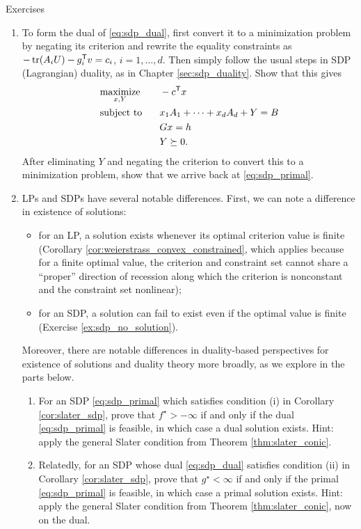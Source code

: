\begin{xcb}{Exercises}
\begin{enumerate}[label=\thechapter.\arabic*]
\item \label{ex:sdp_dual_dual}
  To form the dual of \eqref{eq:sdp_dual}, first convert it to a minimization
  problem by negating its criterion and rewrite the equality constraints as
  $-\operatorname{tr}(A_iU) - g_i^{\mathsf{T}} v = c_i$, $i = 1,\dots,d$. Then simply follow the usual
  steps in SDP (Lagrangian) duality, as in Chapter \ref{sec:sdp_duality}. Show
  that this gives    
  \begin{alignat*}{2}
  &\operatorname*{maximize}_{x,Y} \quad && -c^{\mathsf{T}} x \\ 
  &\operatorname{subject\,\,to} && x_1 A_1 + \cdots + x_d A_d + Y = B \\
  & && Gx = h \\
  & && Y \succeq 0.
  \end{alignat*}
  After eliminating $Y$ and negating the criterion to convert this to a
  minimization problem, show that we arrive back at \eqref{eq:sdp_primal}.  

\item \label{ex:lp_sdp_differences}
  LPs and SDPs have several notable differences. First, we can note a difference
  in existence of solutions:
  \begin{itemize}
  \item for an LP, a solution exists whenever its optimal criterion value is
    finite (Corollary \ref{cor:weierstrass_convex_constrained}, which applies
    because for a finite optimal value, the criterion and constraint set cannot
    share a ``proper'' direction of recession along which the criterion is
    nonconstant and the constraint set nonlinear);     
  \item for an SDP, a solution can fail to exist even if the optimal value is
    finite (Exercise \ref{ex:sdp_no_solution}).   
  \end{itemize}
  Moreover, there are notable differences in duality-based perspectives for
  existence of solutions and duality theory more broadly, as we explore in the
  parts below. 

\begin{enumerate}[label=\alph*.]
\item For an SDP \eqref{eq:sdp_primal} which satisfies condition (i) in
  Corollary \ref{cor:slater_sdp}, prove that $f^\star > -\infty$ if and only if
  the dual \eqref{eq:sdp_primal} is feasible, in which case a dual solution
  exists. Hint: apply the general Slater condition from Theorem
  \ref{thm:slater_conic}.    

\item Relatedly, for an SDP whose dual \eqref{eq:sdp_dual} satisfies condition
  (ii) in Corollary \ref{cor:slater_sdp}, prove that $g^\star < \infty$ if and
  only if the primal \eqref{eq:sdp_primal} is feasible, in which case a primal
  solution exists. Hint: apply the general Slater condition from Theorem
  \ref{thm:slater_conic}, now on the dual.  


\end{enumerate}
\end{enumerate}
\end{xcb}
